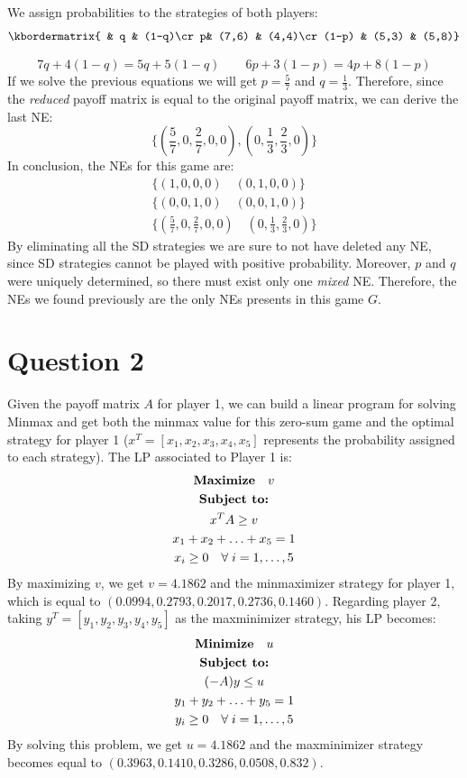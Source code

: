 \documentclass[11pt,a4paper]{article}
\begin{document}
We assign probabilities to the strategies of both players:
\begin{equation*}
\kbordermatrix{
& q & (1-q)\cr
p& (7,6) & (4,4)\cr
(1-p) & (5,3) & (5,8)}
\end{equation*}

\begin{equation*}
7q+4(1-q)=5q+5(1-q) \qquad 6p+3(1-p) = 4p+8(1-p)
\end{equation*}
If we solve the previous equations we will get $p=\frac{5}{7}$ and $q=\frac{1}{3}$. Therefore, since the
\textit{reduced} payoff matrix is equal to the original payoff matrix, we can derive the last NE:
\begin{equation*}
\{ (\frac{5}{7}, 0,\frac{2}{7}, 0, 0), (0, \frac{1}{3}, \frac{2}{3}, 0)\}
\end{equation*}
In conclusion, the NEs for this game are:
\begin{gather*}
\{(1,0,0,0) \quad (0,1,0,0)\}\\
\{(0,0,1,0) \quad (0,0,1,0)\}\\
\{ (\frac{5}{7}, 0,\frac{2}{7}, 0, 0) \quad (0, \frac{1}{3}, \frac{2}{3}, 0)\}
\end{gather*}
By eliminating all the SD strategies we are sure to not have deleted any NE, since
SD strategies cannot be played with positive probability. Moreover, $p$ and $q$ were
uniquely determined, so there must exist only one \textit{mixed} NE. Therefore,
the NEs we found previously are the only NEs presents in this game $G$.

\section{Question 2}
Given the payoff matrix $A$ for player 1, we can build a linear program for solving Minmax
and get both the minmax value for this zero-sum game and the optimal strategy for player 1
($x^{T}=[x_1, x_2, x_3, x_4, x_5]$ represents the probability assigned to each strategy).
The LP associated to Player 1 is:
\begin{gather*}
\hbox{\textbf{Maximize}} \quad v\\
\hbox{\textbf{Subject to:}}\\
x^{T}A \geq v\\
x_1+x_2+\ldots+x_5 = 1\\
x_i \geq 0 \quad \forall \; i=1,\ldots,5
\end{gather*}
By maximizing $v$, we get $v=4.1862$ and the minmaximizer strategy for player 1, which
is equal to $(0.0994, 0.2793, 0.2017, 0.2736, 0.1460)$.
Regarding player 2, taking $y^T=[y_1,y_2,y_3,y_4,y_5]$ as the maxminimizer strategy, his LP becomes:
\begin{gather*}
\hbox{\textbf{Minimize}} \quad u\\
\hbox{\textbf{Subject to:}}\\
(-A)y \leq u\\
y_1+y_2+\ldots+y_5 = 1\\
y_i \geq 0 \quad \forall \; i=1,\ldots,5
\end{gather*}
By solving this problem, we get $u=4.1862$ and the maxminimizer strategy becomes equal to
$(0.3963, 0.1410, 0.3286, 0.0508, 0.832)$.
\medskip
\end{document}
